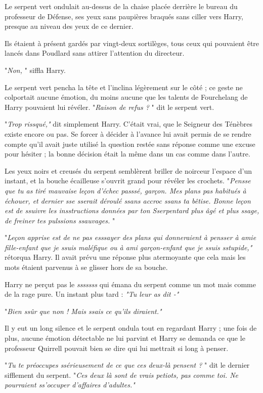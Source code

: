 Le serpent vert ondulait au-dessus de la chaise placée derrière le bureau du professeur de Défense, ses yeux sans paupières braqués sans ciller vers Harry, presque au niveau des yeux de ce dernier.

Ils étaient à présent gardés par vingt-deux sortilèges, tous ceux qui pouvaient être lancés dans Poudlard sans attirer l'attention du directeur.

"\emph{Non,} " siffla Harry.

Le serpent vert pencha la tête et l'inclina légèrement sur le côté ; ce geste ne colportait aucune émotion, du moins aucune que les talents de Fourchelang de Harry pouvaient lui révéler. "\emph{Raison de refus ?} " dit le serpent vert.

"\emph{Trop rissqué,"}  dit simplement Harry. C'était vrai, que le Seigneur des Ténèbres existe encore ou pas. Se forcer à décider à l'avance lui avait permis de se rendre compte qu'il avait juste utilisé la question restée sans réponse comme une excuse pour hésiter ; la bonne décision était la même dans un cas comme dans l'autre.

Les yeux noirs et creusés du serpent semblèrent briller de noirceur l'espace d'un instant, et la bouche écailleuse s'ouvrit grand pour révéler les crochets. "\emph{Pensse que tu as tiré mauvaise leçon d'échec passsé, garçon. Mes plans pas habitués à échouer, et dernier sse sserait déroulé ssans accroc ssans ta bêtise. Bonne leçon est de ssuivre les insstructions données par ton Sserpentard plus âgé et plus ssage, de freiner tes pulssions ssauvages.} "

"\emph{Leçon apprise est de ne pas esssayer des plans qui donneraient à pensser à amie fille-enfant que je ssuis maléfique ou à ami garçon-enfant que je ssuis sstupide,"}  rétorqua Harry. Il avait prévu une réponse plus atermoyante que cela mais les mots étaient parvenus à se glisser hors de sa bouche.

Harry ne perçut pas le \emph{sssssss}  qui émana du serpent comme un mot mais comme de la rage pure. Un instant plus tard : \emph{"Tu leur as dit -"} 

"\emph{Bien ssûr que non ! Mais ssais ce qu'ils diraient."} 

Il y eut un long silence et le serpent ondula tout en regardant Harry ; une fois de plus, aucune émotion détectable ne lui parvint et Harry se demanda ce que le professeur Quirrell pouvait bien se dire qui lui mettrait si long à penser.

"\emph{Tu te préoccupes ssérieusement de ce que ces deux-là pensent ?} " dit le dernier sifflement du serpent. "\emph{Ces deux là sont de vrais petiots, pas comme toi. Ne pourraient ss'occuper d'affaires d'adultes."} 

